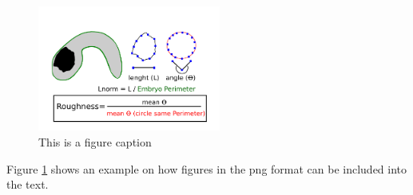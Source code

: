 


\begin{figure}[h]
  \includegraphics[width=6cm]{./Images/Fig.png}
  \centering
  \caption{This is a figure caption}
  \label{fig:Fig}
\end{figure}


Figure \ref{fig:Fig} shows an example on how figures in the 
png format can be included into the text.\par
